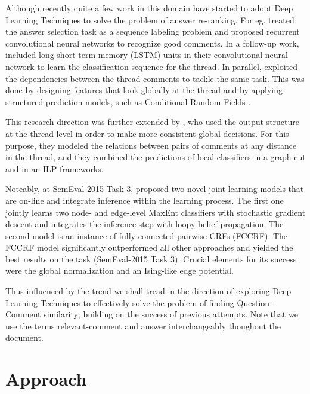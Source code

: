 \documentclass[12pt, a4paper, oneside]{Thesis} %
\newcommand{\mychapter}[2]{
    \setcounter{chapter}{#1}
    \setcounter{section}{0}
    \chapter*{#2}
    \addcontentsline{toc}{chapter}{#2}
    \lhead{\emph{#2}}
}
\begin{document}
Although recently quite a few work in this domain have started to adopt Deep Learning Techniques to solve the problem of answer re-ranking. For eg. \cite{lin2015icrc} treated the answer selection task as a sequence labeling problem and proposed recurrent convolutional neural networks to recognize good comments. In a follow-up work, \cite{zhou2015answer} included long-short term memory (LSTM) units in their convolutional neural network to learn the classification sequence for the thread. In parallel, \cite{barron2015thread} exploited the dependencies between the thread comments to tackle the same task. This was done by designing features that look globally at the thread and by applying structured prediction models, such as Conditional Random Fields \cite{lafferty2001conditional}.

This research direction was further extended by \cite{joty2015global}, who used the output structure at the thread level in order to make more consistent global decisions. For this purpose, they modeled the relations between pairs of comments at any distance in the thread, and they combined the predictions of local classifiers in a graph-cut and in an ILP frameworks.

Noteably, at SemEval-2015 Task 3, \cite{shafiq2016joint} proposed two novel joint learning models that are on-line and integrate inference within the learning process. The first one jointly learns two node- and edge-level MaxEnt classifiers with stochastic gradient descent and integrates the inference step with loopy belief propagation. The second model is an instance of fully connected pairwise CRFs (FCCRF). The FCCRF model significantly outperformed all other approaches and yielded the best results on the task (SemEval-2015 Task 3). Crucial elements for its success were the global normalization and an Ising-like edge potential.


Thus influenced by the trend we shall tread in the direction of exploring Deep Learning Techniques to effectively solve the problem of finding Question - Comment similarity; building on the success of previous attempts. Note that we use the terms relevant-comment and answer interchangeably thoughout the document.



\mychapter{3}{Approach}
\label{chap:approach}
\end{document}

